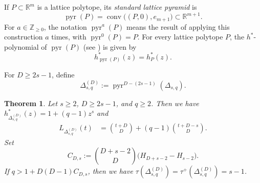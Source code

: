 \documentclass[reqno, 12pt]{article}
\numberwithin{equation}{section}
\newtheorem{theorem}{Theorem}[section]
\theoremstyle{definition}
\newcommand{\R}{\mathbb{R}}
\newcommand{\N}{\mathbb{Z}_{\geq 0}}
\newcommand{\conv}{\operatorname{conv}}
\begin{document}
If $P\subset\R^m$ is a lattice polytope, its \emph{standard lattice pyramid} is
\[\operatorname{pyr}(P)=\conv\bigl((P,0),e_{m+1}\bigr)\subset\R^{m+1}.\]
For $a\in\N$, the notation $\operatorname{pyr}^{a}(P)$ means the result of applying this construction $a$ times, with
$\operatorname{pyr}^{0}(P)=P$.
For every lattice polytope $P$, the $h^*$-polynomial of $\operatorname{pyr}(P)$ (see \cite[Theorem 2.4]{BeckRobins2015}) is given by
$$h_{\operatorname{pyr}(P)}^*(z)=h_P^*(z).$$


For $D\geq2s-1$, define
\begin{equation*}
 \Delta_{s,q}^{(D)} :=\operatorname{pyr}^{D-(2s-1)}(\Delta_{s,q}).
\end{equation*}
\begin{theorem}\label{thm:pyramid-sharpness}
Let $s\geq2$, $D\geq2s-1$, and $q\geq2$.  Then we have $h_{\Delta_{s,q}^{(D)}}^*(z)=1+(q-1)z^s$ and 
\begin{align}
L_{\Delta_{s,q}^{(D)}}(t)&=\binom{t+D}{D}+(q-1)\binom{t+D-s}{D}.\label{eq:pyramid-ehrhart}
\end{align}
Set
\begin{equation*}
 C_{D,s}:= \binom{D+s-2}{D}\bigl(H_{D+s-2}-H_{s-2}\bigr).
\end{equation*}
If $q>1+D(D-1)C_{D,s}$, then we have $\tau(\Delta_{s,q}^{(D)})=\tau^+(\Delta_{s,q}^{(D)})=s-1$.
\end{theorem}
\end{document}
